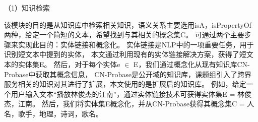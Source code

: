 





（1）知识检索

该模块的目的是从知识库中检索相关知识，语义关系主要选用isA，isPropertyOf两种，给定一个简短的文本，希望找到与其相关的概念集C。
可通过两个主要步骤来实现此目的：实体链接和概念化。
实体链接是NLP中的一项重要任务，用于识别短文本中提到的实体\cite{moro2014entity}，
本文通过利用现有的实体链接解决方案，获得了短文本的实体集E\cite{chen2018short}。
然后，对于每个实体e $\in$ E，我们通过概念化从现有知识库CN-Probase中获取其概念信息，
CN-Probase是公开域的知识库，课题组引入了跨界服务相关的知识对其进行了扩展，本文使用的是扩展后的知识库。
例如，给定一个用户输入文本“播放林俊杰的江南”，通过实体链接技术可获得实体集E = {林俊杰，江南}。
然后，我们将实体集E概念化，并从CN-Probase获得其概念集C = {人名，歌手，地理，诗词，歌名}。

